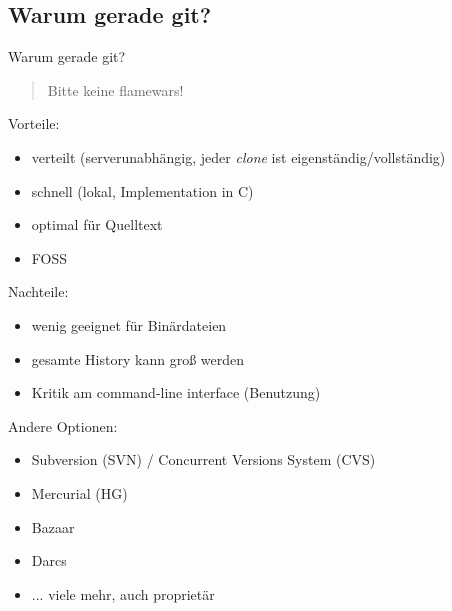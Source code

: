 \subsection{Warum gerade git?}
\begin{frame}{Warum gerade git?}
    \begin{quote}
        Bitte keine flamewars!
    \end{quote}

    \pause

    \only<+> {
        Vorteile:
        \begin{itemize}
            \item verteilt (serverunabhängig, jeder \emph{clone} ist eigenständig/vollständig)
            \item schnell (lokal, Implementation in C)
            \item optimal für Quelltext
            \item FOSS
        \end{itemize}

        Nachteile:
        \begin{itemize}
            \item wenig geeignet für Binärdateien
            \item gesamte History kann groß werden
            \item Kritik am command-line interface (Benutzung)
        \end{itemize}
    }
    \only<+> {
        Andere Optionen:
        \begin{itemize}
            \item Subversion (SVN) / Concurrent Versions System (CVS)
            \item Mercurial (HG)
            \item Bazaar
            \item Darcs
            \item ... viele mehr, auch proprietär
        \end{itemize}
    }
\end{frame}
